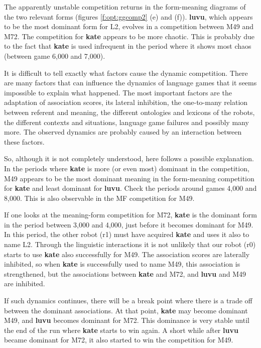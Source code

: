 The apparently unstable competition returns in the form-meaning diagrams of the two relevant forms (figures \ref{f:opt:ggcomp2} (e) and (f)). {\bf luvu}, which appears to be the most dominant form for L2, evolves in a competition between M49 and M72. The competition for {\bf kate} appears to be more chaotic. This is probably due to the fact that {\bf kate} is used infrequent in the period where it shows most chaos (between game 6,000 and 7,000).

It is difficult to tell exactly what factors cause the dynamic competition. There are many factors that can influence the dynamics of language games that it seems impossible to explain what happened. The most important factors are the adaptation of association scores, its lateral inhibition, the one-to-many relation between referent and meaning, the different ontologies and lexicons of the robots, the different contexts and situations, language game failures and possibly many more. The observed dynamics are probably caused by an interaction between these factors.


So, although it is not completely understood, here follows a possible explanation. In the periods where {\bf kate} is more (or even most) dominant in the competition, M49 appears to be the most dominant meaning in the form-meaning competition for {\bf kate} and least dominant for {\bf luvu}. Check the periods around games 4,000 and 8,000. This is also observable in the MF competition for M49.

If one looks at the meaning-form competition for M72, {\bf kate} is the dominant form in the period between 3,000 and 4,000, just before it becomes dominant for M49. In this period, the other robot (r1) must have acquired {\bf kate} and uses it also to name L2. Through the linguistic interactions it is not unlikely that our robot (r0) starts to use {\bf kate} also successfully for M49. The association scores are laterally inhibited, so when {\bf kate} is successfully used to name M49, this association is strengthened, but the associations between {\bf kate} and M72, and {\bf luvu} and M49 are inhibited.

If such dynamics continues, there will be a break point where there is a trade off between the dominant associations. At that point, {\bf kate} may become dominant M49, and {\bf luvu} becomes dominant for M72. This dominance is very stable until the end of the run where {\bf kate} starts to win again. A short while after {\bf luvu} became dominant for M72, it also started to win the competition for M49.

